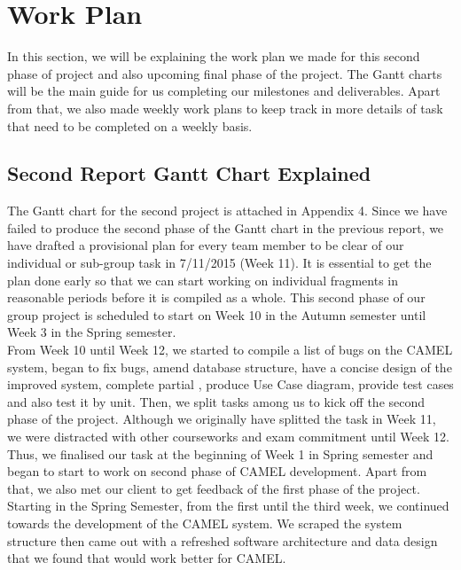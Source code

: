 \section{Work Plan}
In this section, we will be explaining the work plan we made for this second phase of project and also upcoming final phase of the project. The Gantt charts will be the main guide for us completing our milestones and deliverables. Apart from that, we also made weekly work plans to keep track in more details of task that need to be completed on a weekly basis.

\subsection*{Second Report Gantt Chart Explained}

The Gantt chart for the second project is attached in Appendix 4. Since we have failed to produce the second phase of the Gantt chart in the previous report, we have drafted a provisional plan for every team member to be clear of our individual or sub-group task in 7/11/2015 (Week 11). It is essential to get the plan done early so that we can start working on individual fragments in reasonable periods before it is compiled as a whole. This second phase of our group project is scheduled to start on Week 10 in the Autumn semester until Week 3 in the Spring semester.\\

 From Week 10 until Week 12, we started to compile a list of bugs on the CAMEL system, began to fix bugs, amend database structure, have a concise design of the improved system, complete partial , produce Use Case diagram, provide test cases and also test it by unit. Then, we split tasks among us to kick off the second phase of the project. Although we originally have splitted the task in Week 11, we were distracted with other courseworks and exam commitment until Week 12. Thus, we finalised our task at the beginning of Week 1 in Spring semester and began to start to work on second phase of CAMEL development.   Apart from that, we also met our client to get feedback of the first phase of the project. Starting in the Spring Semester, from the first until the third week, we continued towards the development of the CAMEL system. We scraped the system structure then came out with a refreshed software architecture and data design that we found that would work better for CAMEL.\\
 
